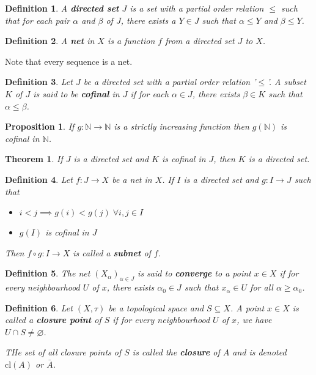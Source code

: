 \documentclass[12pt,twoside]{report}
\newtheorem{defn}{Definition}
\newtheorem{thm}{Theorem}
\newtheorem{prop}[subsection]{Proposition}
\begin{document}
\begin{defn}
    A \textbf{directed set} $J$ is a set with a partial order relation $\leq$ such that for each pair $\alpha$ and $\beta$ of $J$, there exists a $Y \in J$ such that $\alpha \leq Y$ and $\beta \leq Y$.
\end{defn}

\begin{defn}
    A \textbf{net} in $X$ is a function $f$ from a directed set $J$ to $X$.
\end{defn}

Note that every sequence is a net.

\begin{defn}
    Let $J$ be a directed set with a partial order relation '$\leq$'. A subset $K$ of $J$ is said to be \textbf{cofinal} in $J$ if for each $\alpha \in J$, there exists $\beta \in K$ such that $\alpha \leq \beta$.
\end{defn}

\begin{prop}
    If $g \colon \mathbb{N} \to \mathbb{N}$ is a strictly increasing function then $g\left (\mathbb{N}\right )$ is cofinal in $\mathbb{N}$.
\end{prop}

\begin{thm}
    If $J$ is a directed set and $K$ is cofinal in $J$, then $K$ is a directed set.
\end{thm}

\begin{defn}
    Let $f \colon J \to X$ be a net in $X$. If $I$ is a directed set and $g \colon I \to J$ such that 
    \begin{itemize}
        \item $i < j \implies g\left (i\right ) < g\left (j\right ) \;\forall i, j \in I$
        \item $g\left (I\right )$ is cofinal in $J$
    \end{itemize}
    Then $f \circ g \colon I \to X$ is called a \textbf{subnet} of $f$.
\end{defn}

\begin{defn}
    The net $\left (X_\alpha\right )_{\alpha \in J}$ is said to \textbf{converge} to a point $x \in X$ if for every neighbourhood $U$ of $x$, there exists $\alpha_0 \in J$ such that $x_\alpha \in U$ for all $\alpha \geq \alpha_0$.
\end{defn}

\begin{defn}
    Let $\left (X, \tau\right )$ be a topological space and $S \subseteq X$. A point $x \in X$ is called a \textbf{closure point} of $S$ if for every neighbourhood $U$ of $x$, we have $U \cap S \neq  \varnothing$.

    THe set of all closure points of $S$ is called the \textbf{closure} of $A$ and is denoted $\text{cl}\left (A\right )$ or $\bar{A}$.
\end{defn}
\end{document}
